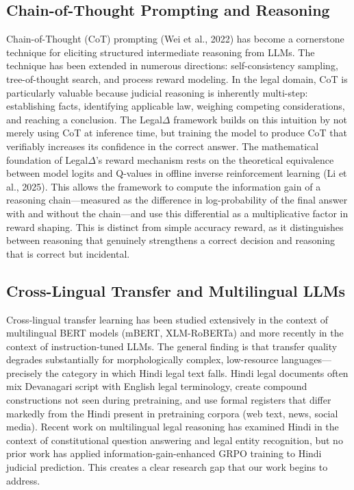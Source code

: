 \documentclass[conference]{IEEEtran}
\begin{document}
\subsection{Chain-of-Thought Prompting and Reasoning}
Chain-of-Thought (CoT) prompting (Wei et al., 2022) has become a cornerstone technique for eliciting structured intermediate reasoning from LLMs. The technique has been extended in numerous directions: self-consistency sampling, tree-of-thought search, and process reward modeling. In the legal domain, CoT is particularly valuable because judicial reasoning is inherently multi-step: establishing facts, identifying applicable law, weighing competing considerations, and reaching a conclusion. The Legal$\Delta$ framework builds on this intuition by not merely using CoT at inference time, but training the model to produce CoT that verifiably increases its confidence in the correct answer.
The mathematical foundation of Legal$\Delta$'s reward mechanism rests on the theoretical equivalence between model logits and Q-values in offline inverse reinforcement learning (Li et al., 2025). This allows the framework to compute the information gain of a reasoning chain—measured as the difference in log-probability of the final answer with and without the chain—and use this differential as a multiplicative factor in reward shaping. This is distinct from simple accuracy reward, as it distinguishes between reasoning that genuinely strengthens a correct decision and reasoning that is correct but incidental.

\subsection{Cross-Lingual Transfer and Multilingual LLMs}
Cross-lingual transfer learning has been studied extensively in the context of multilingual BERT models (mBERT, XLM-RoBERTa) and more recently in the context of instruction-tuned LLMs. The general finding is that transfer quality degrades substantially for morphologically complex, low-resource languages—precisely the category in which Hindi legal text falls. Hindi legal documents often mix Devanagari script with English legal terminology, create compound constructions not seen during pretraining, and use formal registers that differ markedly from the Hindi present in pretraining corpora (web text, news, social media).
Recent work on multilingual legal reasoning has examined Hindi in the context of constitutional question answering and legal entity recognition, but no prior work has applied information-gain-enhanced GRPO training to Hindi judicial prediction. This creates a clear research gap that our work begins to address.
\end{document}
